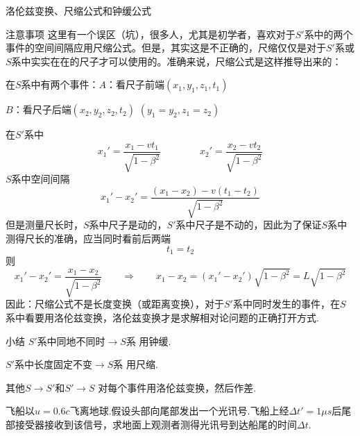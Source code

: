 \documentclass[a4paper, opensource]{./template/qyxf-book}
\begin{document}
\begin{section}{洛伦兹变换、尺缩公式和钟缓公式}
\begin{subsection}{注意事项}
这里有一个误区（坑），很多人，尤其是初学者，喜欢对于$S'$系中的两个事件的空间间隔应用尺缩公式。但是，其实这是不正确的，尺缩仅仅是对于$S'$系或$S$系中实实在在的尺子才可以使用的。准确来说，尺缩公式是这样推导出来的：

在$S$系中有两个事件：$A$：看尺子前端$(x_1,y_1,z_1,t_1)$

\hspace{10em} $B$：看尺子后端$(x_2,y_2,z_2,t_2)$ \hspace{4em} $(y_1=y_2,z_1=z_2)$

在$S'$系中
\begin{equation*}
x_1'=\frac{x_1-vt_1}{\sqrt{1-\beta^2}} \hspace{4em} x_2'=\frac{x_2-vt_2}{\sqrt{1-\beta^2}}
\end{equation*}
$S$系中空间间隔
\begin{equation*}
x_1'-x_2'=\frac{(x_1-x_2)-v(t_1-t_2)}{\sqrt{1-\beta^2}}
\end{equation*}
但是测量尺长时，$S$系中尺子是动的，$S'$系中尺子是不动的，因此为了保证$S$系中测得尺长的准确，应当同时看前后两端
\begin{equation*}
t_1=t_2
\end{equation*}
则
\begin{equation*}
x_1'-x_2'=\frac{x_1-x_2}{\sqrt{1-\beta^2}} \hspace{2em} \Rightarrow \hspace{2em}
x_1-x_2=(x_1'-x_2')\sqrt{1-\beta^2}=L\sqrt{1-\beta^2}
\end{equation*}
因此：尺缩公式不是长度变换（或距离变换），对于$S'$系中同时发生的事件，在$S$系中看要用洛伦兹变换，洛伦兹变换才是求解相对论问题的正确打开方式.
\end{subsection}

\begin{subsection}{小结}
$S'$系中同地不同时$ \rightarrow S$系 \hspace{2em} 用钟缓.

$S'$系中长度固定不变$ \rightarrow S$系 \hspace{1em} 用尺缩.

其他$S \rightarrow S'$和$S' \rightarrow S$ \hspace{4em}对每个事件用洛伦兹变换，然后作差.
\end{subsection}

飞船以$u=0.6c$飞离地球.假设头部向尾部发出一个光讯号.飞船上经$\Delta t'=1\mu s$后尾部接受器接收到该信号，求地面上观测者测得光讯号到达船尾的时间$\Delta t$.


\end{section}
\end{document}
